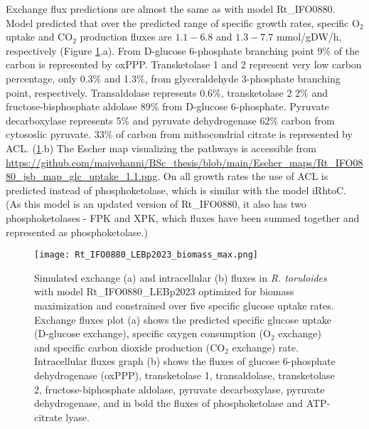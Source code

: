 Exchange flux predictions are almost the same as with model Rt\_IFO0880. Model predicted that over the predicted range of specific growth rates, specific O$_2$ uptake and CO$_2$ production fluxes are $1.1-6.8$ and $1.3-7.7$ \unit{mmol/gDW/h}, respectively (Figure \ref{fig:Rt_IFO0880_LEBp2023_biomass_max}.a).
From D-glucose 6-phosphate branching point 9\% of the carbon is represented by oxPPP. 
Transketolase 1 and 2 represent very
low carbon percentage, only 0.3\% and 1.3\%, from glyceraldehyde 3-phosphate branching point, respectively. Transaldolase represents 0.6\%, transketolase 2 2\% and fructose-bisphosphate aldolase 89\% from D-glucose 6-phosphate. Pyruvate decarboxylase represents 5\% and pyruvate dehydrogenase 62\% carbon from cytososlic pyruvate. %
33\% of carbon from mithocondrial citrate is represented by ACL. (\ref{fig:Rt_IFO0880_LEBp2023_biomass_max}.b)
The Escher map visualizing the pathways is accessible from \url{https://github.com/maivehanni/BSc_thesis/blob/main/Escher_maps/Rt_IFO0880_jsb_map_glc_uptake_1.1.png}.
On all growth rates the use of ACL is predicted instead of phosphoketolase, which is similar with the model iRhtoC. 
(As this model is an updated version of Rt\_IFO0880, it also has two phosphoketolases - FPK and XPK, which fluxes
have been summed together and represented as phosphoketolase.) 
\begin{figure}[H]
    \centering
    \texttt{[image: Rt\_IFO0880\_LEBp2023\_biomass\_max.png]}
    \caption{Simulated exchange (a) and intracellular (b) fluxes in \textit{R. toruloides} with model Rt\_IFO0880\_LEBp2023 optimized for biomass maximization and constrained over five specific glucose uptake rates. Exchange fluxes plot (a) shows the predicted specific glucose uptake (D-glucose exchange), specific oxygen consumption (O$_2$ exchange) and specific carbon dioxide production (CO$_2$ exchange) rate. Intracellular fluxes graph (b) shows the fluxes of glucose 6-phosphate dehydrogenase (oxPPP), transketolase 1, transaldolase, transketolase 2, fructose-biphosphate aldolase, pyruvate decarboxylase, pyruvate dehydrogenase, and in bold the fluxes of phosphoketolase and ATP-citrate lyase.}
    \label{fig:Rt_IFO0880_LEBp2023_biomass_max}
\end{figure}

